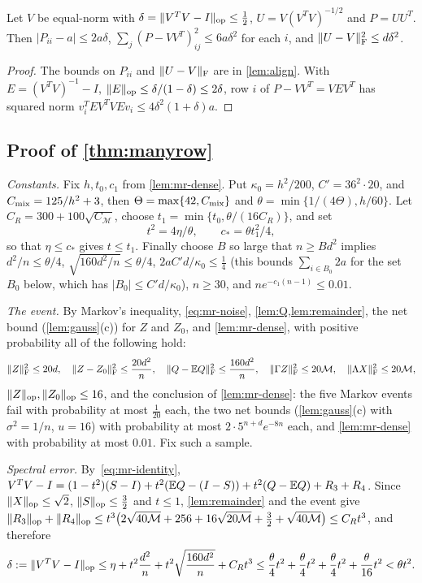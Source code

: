 \begin{lemma}\label{lem:whiten}
Let $V$ be equal-norm with $\delta=\lVert V^TV-I\rVert_{\mathrm{op}}\le\frac12$, $U=V(V^TV)^{-1/2}$ and
$P=UU^T$. Then $|P_{ii}-a|\le2a\delta$,
$\sum_j(P-VV^T)_{ij}^2\le6a\delta^2$ for each $i$, and $\lVert U-V\rVert_{\mathrm F}^2\le d\delta^2$.
\end{lemma}

\begin{proof}
The bounds on $P_{ii}$ and $\lVert U-V\rVert_{\mathrm F}$ are in \cref{lem:align}. With
$E=(V^TV)^{-1}-I$, $\lVert E\rVert_{\mathrm{op}}\le\delta/(1-\delta)\le2\delta$, row $i$ of
$P-VV^T=VEV^T$ has squared norm $v_i^TEV^TVEv_i\le4\delta^2(1+\delta)a$.
\end{proof}

\subsection{Proof of \texorpdfstring{\cref{thm:manyrow}}{Theorem}}

\emph{Constants.} Fix $h,t_0,c_1$ from \cref{lem:mr-dense}. Put $\kappa_0=h^2/200$,
$C'=36^2\cdot20$, and
$C_{\rm mix}=125/h^2+3$, then $\Theta=\max\{42,C_{\rm mix}\}$ and
$\theta=\min\{1/(4\Theta),h/60\}$. Let $C_R=300+100\sqrt{C_{\mathcal M}}$, choose $t_1=\min\{t_0,\theta/(16C_R)\}$, and set
\[
 t^2=4\eta/\theta,\qquad c_*=\theta t_1^2/4,
\]
so that $\eta\le c_*$ gives $t\le t_1$. Finally choose $B$ so large that
$n\ge Bd^2$ implies $d^2/n\le\theta/4$, $\sqrt{160d^2/n}\le\theta/4$,
$2aC'd/\kappa_0\le\frac14$ (this bounds $\sum_{i\in B_0}2a$ for the set $B_0$
below, which has $|B_0|\le C'd/\kappa_0$), $n\ge30$, and $ne^{-c_1(n-1)}\le0.01$.

\emph{The event.} By Markov's inequality, \eqref{eq:mr-noise},
\cref{lem:Q,lem:remainder}, the net bound (\cref{lem:gauss}(c)) for $Z$ and
$Z_0$, and \cref{lem:mr-dense}, with positive probability all of the following
hold:
\[
 \lVert Z\rVert_{\mathrm F}^2\le20d,\quad \lVert Z-Z_0\rVert_{\mathrm F}^2\le\frac{20d^2}n,\quad
 \lVert Q-\mathbb E Q\rVert_{\mathrm F}^2\le\frac{160d^2}n,\quad
 \lVert \Gamma Z\rVert_{\mathrm F}^2\le20\mathcal M,\quad \lVert \Lambda X\rVert_{\mathrm F}^2\le20\mathcal M,
\]
$\lVert Z\rVert_{\mathrm{op}},\lVert Z_0\rVert_{\mathrm{op}}\le16$, and the conclusion of \cref{lem:mr-dense}: the five Markov
events fail with probability at most $\frac1{20}$ each, the two net bounds
(\cref{lem:gauss}(c) with $\sigma^2=1/n$, $u=16$) with probability at most
$2\cdot5^{n+d}e^{-8n}$ each, and \cref{lem:mr-dense} with probability at most
$0.01$. Fix such a sample.

\emph{Spectral error.} By~\eqref{eq:mr-identity},
$V^TV-I=(1-t^2)(S-I)+t^2(\mathbb E Q-(I-S))+t^2(Q-\mathbb E Q)+R_3+R_4$. Since
$\lVert X\rVert_{\mathrm{op}}\le\sqrt2$, $\lVert S\rVert_{\mathrm{op}}\le\frac32$ and $t\le1$, \cref{lem:remainder} and the
event give
$\lVert R_3\rVert_{\mathrm{op}}+\lVert R_4\rVert_{\mathrm{op}}\le t^3\bigl(2\sqrt{40\mathcal M}+256+16\sqrt{20\mathcal M}
+\tfrac32+\sqrt{40\mathcal M}\bigr)\le C_Rt^3$, and therefore
\[
 \delta:=\lVert V^TV-I\rVert_{\mathrm{op}}\le\eta+t^2\frac{d^2}n+t^2\sqrt{\frac{160d^2}n}+C_Rt^3
 \le\frac\theta4t^2+\frac\theta4t^2+\frac\theta4t^2+\frac\theta{16}t^2<\theta t^2 .
\]

